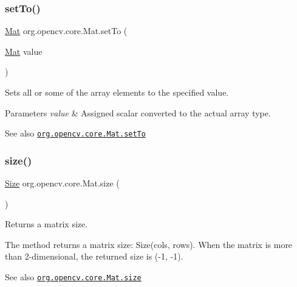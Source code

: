 \subsubsection{\texorpdfstring{set\+To()}{setTo()}\hspace{0.1cm}{\footnotesize\ttfamily [4/4]}}
{\footnotesize\ttfamily \mbox{\hyperlink{classorg_1_1opencv_1_1core_1_1_mat}{Mat}} org.\+opencv.\+core.\+Mat.\+set\+To (\begin{DoxyParamCaption}\item[{\mbox{\hyperlink{classorg_1_1opencv_1_1core_1_1_mat}{Mat}}}]{value }\end{DoxyParamCaption})}

Sets all or some of the array elements to the specified value.


\begin{DoxyParams}{Parameters}
{\em value} & Assigned scalar converted to the actual array type.\\
\hline
\end{DoxyParams}
\begin{DoxySeeAlso}{See also}
\href{http://docs.opencv.org/modules/core/doc/basic_structures.html#mat-setto}{\tt org.\+opencv.\+core.\+Mat.\+set\+To} 
\end{DoxySeeAlso}
\mbox{\label{classorg_1_1opencv_1_1core_1_1_mat_a543d6f8a103a5f3d899030d76286f0cf}} 
\subsubsection{\texorpdfstring{size()}{size()}}
{\footnotesize\ttfamily \mbox{\hyperlink{classorg_1_1opencv_1_1core_1_1_size}{Size}} org.\+opencv.\+core.\+Mat.\+size (\begin{DoxyParamCaption}{ }\end{DoxyParamCaption})}

Returns a matrix size.

The method returns a matrix size\+: {\ttfamily Size(cols, rows)}. When the matrix is more than 2-\/dimensional, the returned size is (-\/1, -\/1).

\begin{DoxySeeAlso}{See also}
\href{http://docs.opencv.org/modules/core/doc/basic_structures.html#mat-size}{\tt org.\+opencv.\+core.\+Mat.\+size} 
\end{DoxySeeAlso}
\mbox{\label{classorg_1_1opencv_1_1core_1_1_mat_a758053ee22fe72074db5934097477cfe}} 
